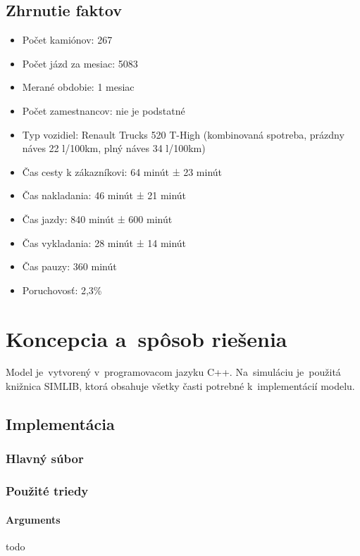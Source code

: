 \documentclass[a4paper, 11pt]{article}
\begin{document}
    \subsection{Zhrnutie faktov}
    \begin{itemize}
        \item Počet kamiónov: 267
        \item Počet jázd za mesiac: 5083
        \item Merané obdobie: 1 mesiac
        \item Počet zamestnancov: nie je podstatné
        \item Typ vozidiel: Renault Trucks 520 T-High (kombinovaná spotreba, prázdny náves 22 l/100km, plný náves 34 l/100km)
        \item Čas cesty k zákazníkovi: 64 minút ± 23 minút
        \item Čas nakladania: 46 minút ± 21 minút
        \item Čas jazdy: 840 minút ± 600 minút
        \item Čas vykladania: 28 minút ± 14 minút
        \item Čas pauzy: 360 minút
        \item Poruchovosť: 2,3\%
    \end{itemize}

	\newpage
    \section{Koncepcia a~spôsob riešenia}
	Model je~vytvorený v~programovacom jazyku C++. Na~simuláciu je~použitá knižnica
    SIMLIB, ktorá obsahuje všetky časti potrebné k~implementácií modelu.

    \subsection{Implementácia}

    \subsubsection{Hlavný súbor}

    \subsubsection{Použité triedy}
    \paragraph{Arguments}
    todo \cite[snímka 28]{IMS_prezentácia}
\end{document}
